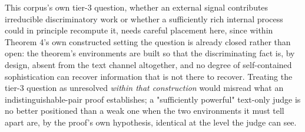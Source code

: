 \documentclass[11pt]{article}
\begin{document}
This corpus's own tier-3 question, whether an external signal contributes irreducible discriminatory work or whether a sufficiently rich internal process could in principle recompute it, needs careful placement here, since within Theorem 4's own constructed setting the question is already closed rather than open: the theorem's environments are built so that the discriminating fact is, by design, absent from the text channel altogether, and no degree of self-contained sophistication can recover information that is not there to recover. Treating the tier-3 question as unresolved \emph{within that construction} would misread what an indistinguishable-pair proof establishes; a "sufficiently powerful" text-only judge is no better positioned than a weak one when the two environments it must tell apart are, by the proof's own hypothesis, identical at the level the judge can see.
\end{document}
